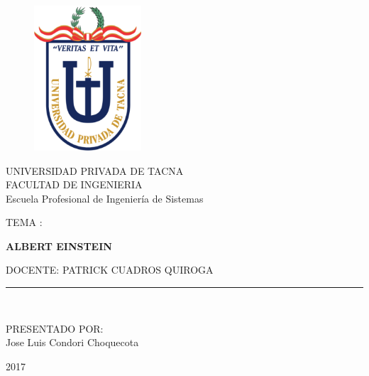 \documentclass[a4paper,openright,12pt]{report}
\begin{document}
\begin{titlepage}
\begin{center}
\vspace*{-1in}
\begin{figure}[htb]
\begin{center}
\includegraphics[width=4cm]{./images/upt}
\end{center}
\end{figure}

UNIVERSIDAD PRIVADA DE TACNA\\
\vspace*{0.15in}
FACULTAD DE INGENIERIA\\
Escuela Profesional de Ingeniería de Sistemas\\
\vspace*{0.6in}
\begin{large}
TEMA : \\
\end{large}
\vspace*{0.2in}
\begin{Large}
\textbf{ALBERT EINSTEIN} \\
\end{Large}
\vspace*{0.3in}
\begin{large}
DOCENTE: PATRICK CUADROS QUIROGA\\
\end{large}
\vspace*{0.3in}
\rule{80mm}{0.1mm}\\
\vspace*{0.1in}
\begin{large}
PRESENTADO POR: \\
Jose Luis Condori Choquecota \\
\end{large}
\vspace*{2in}
\begin{large}
2017\\
\end{large}
\end{center}





\end{titlepage}
\end{document}
